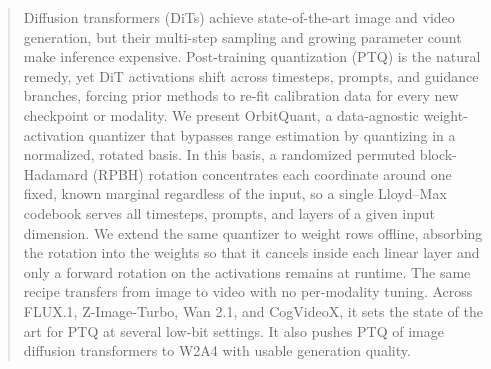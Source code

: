 \begin{abstract}
Diffusion transformers (DiTs) achieve state-of-the-art image and video generation, but their multi-step sampling and growing parameter count make inference expensive. Post-training quantization (PTQ) is the natural remedy, yet DiT activations shift across timesteps, prompts, and guidance branches, forcing prior methods to re-fit calibration data for every new checkpoint or modality. We present OrbitQuant, a data-agnostic weight-activation quantizer that bypasses range estimation by quantizing in a normalized, rotated basis. In this basis, a randomized permuted block-Hadamard (RPBH) rotation concentrates each coordinate around one fixed, known marginal regardless of the input, so a single Lloyd–Max codebook serves all timesteps, prompts, and layers of a given input dimension. We extend the same quantizer to weight rows offline, absorbing the rotation into the weights so that it cancels inside each linear layer and only a forward rotation on the activations remains at runtime. The same recipe transfers from image to video with no per-modality tuning. Across FLUX.1, Z-Image-Turbo, Wan 2.1, and CogVideoX, it sets the state of the art for PTQ at several low-bit settings. It also pushes PTQ of image diffusion transformers to W2A4 with usable generation quality.
\end{abstract}
\vspace{-6mm}

